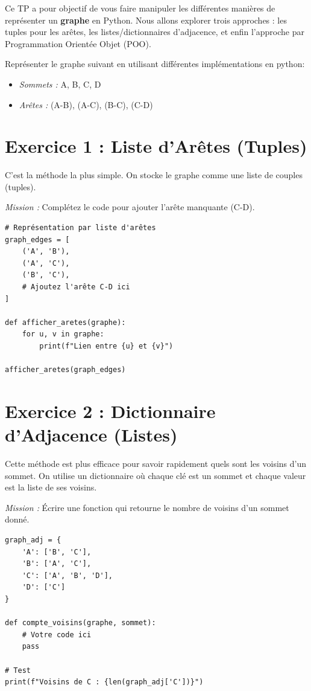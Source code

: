 Ce TP a pour objectif de vous faire manipuler les différentes manières de représenter un \textbf{graphe} en Python. Nous allons explorer trois approches : les tuples pour les arêtes, les listes/dictionnaires d'adjacence, et enfin l'approche par Programmation Orientée Objet (POO).
\vspace{-1cm}

\begin{Objectif}
    Représenter le graphe suivant en utilisant différentes implémentations en python:
\begin{itemize}
    \item \textit{Sommets :} A, B, C, D
    \item \textit{Arêtes :} (A-B), (A-C), (B-C), (C-D)
\end{itemize}
\end{Objectif}



\section*{ Exercice 1 : Liste d'Arêtes (Tuples)}

C’est la méthode la plus simple. On stocke le graphe comme une liste de couples (tuples).
\begin{Avous}
    \textit{Mission :} Complétez le code pour ajouter l'arête manquante (C-D).
\end{Avous}

\vspace{-0.5cm}
\begin{lstlisting}
# Représentation par liste d'arêtes
graph_edges = [
    ('A', 'B'),
    ('A', 'C'),
    ('B', 'C'),
    # Ajoutez l'arête C-D ici
]

def afficher_aretes(graphe):
    for u, v in graphe:
        print(f"Lien entre {u} et {v}")

afficher_aretes(graph_edges)

\end{lstlisting}



\section*{ Exercice 2 : Dictionnaire d'Adjacence (Listes)}

Cette méthode est plus efficace pour savoir rapidement quels sont les voisins d'un sommet. On utilise un dictionnaire où chaque clé est un sommet et chaque valeur est la liste de ses voisins.
\begin{Avous}
\textit{Mission :} Écrire une fonction qui retourne le nombre de voisins d'un sommet donné.
\end{Avous}
\vspace{-0.5cm}
\begin{lstlisting}
graph_adj = {
    'A': ['B', 'C'],
    'B': ['A', 'C'],
    'C': ['A', 'B', 'D'],
    'D': ['C']
}

def compte_voisins(graphe, sommet):
    # Votre code ici
    pass

# Test
print(f"Voisins de C : {len(graph_adj['C'])}") 

\end{lstlisting}



